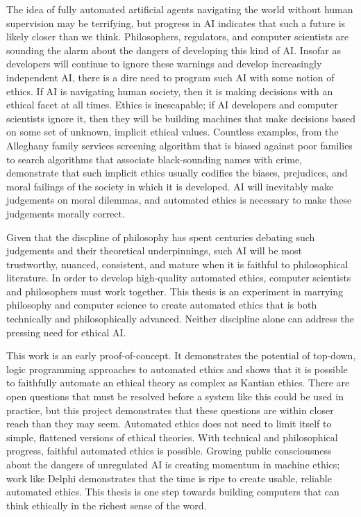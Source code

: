 \begin{isabellebody}
\begin{isamarkuptext}
The idea of fully automated artificial agents navigating the world without human supervision
may be terrifying, but progress in AI indicates that such a future is likely closer than we think. 
Philosophers, regulators, and computer scientists are sounding the alarm about the dangers of developing
this kind of AI. Insofar as developers will continue to ignore these warnings and develop increasingly 
independent AI, there is a dire need to program such AI with some notion of ethics. If AI is navigating
human society, then it is making decisions with an ethical facet at all times. Ethics is inescapable; 
if AI developers and computer scientists ignore it, then they will be building machines that make decisions
based on some set of unknown, implicit ethical values. Countless examples, from the Alleghany family services screening
algorithm that is biased against poor families to search algorithms that associate black-sounding names
with crime, demonstrate that such implicit ethics usually codifies the biases, prejudices, and moral
failings of the society in which it is developed. AI will inevitably make judgements on moral dilemmas, 
and automated ethics is necessary to make these judgements morally correct. 

Given that the discpline of philosophy has spent centuries debating such judgements and their theoretical 
underpinnings, such AI will be most trustworthy, nuanced, consistent, and mature when it is faithful to 
philosophical literature. In order to develop high-quality automated ethics, computer scientists and 
philosophers must work together. This thesis is an experiment in marrying philosophy and computer science 
to create automated ethics that is both technically and philosophically advanced. Neither discipline alone
can address the pressing need for ethical AI.

This work is an early proof-of-concept. It demonstrates the potential of top-down, logic programming 
approaches to automated ethics and shows that it is possible to faithfully automate an ethical theory as
complex as Kantian ethics. There are open questions that must be resolved before a system like this 
could be used in practice, but this project demonstrates that these questions are within closer reach
than they may seem. Automated ethics does not need to limit itself to simple, flattened versions of 
ethical theories. With technical and philosophical progress, faithful automated ethics is possible.
Growing public consciousness about the dangers of unregulated AI is creating momentum in machine ethics; 
work like Delphi demonstrates that the time is ripe to create usable, reliable automated ethics. This 
thesis is one step towards building computers that can think ethically in the richest sense of the word.%
\end{isamarkuptext}\isamarkuptrue%
%
\isadelimtheory
%
\endisadelimtheory
%
\isatagtheory
%
\endisatagtheory
{\isafoldtheory}%
%
\isadelimtheory
%
\endisadelimtheory
%
\end{isabellebody}%
